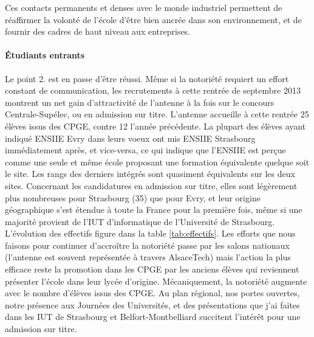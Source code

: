 \documentclass[11pt]{article}
\begin{document}
\medskip
Ces  contacts  permanents et  denses  avec  le  monde industriel  permettent  de
réaffirmer la volonté de l'école d'être bien ancrée dans son environnement, et de
fournir des cadres de haut niveau aux entreprises.



\paragraph{Étudiants entrants} 
Le point 2. est en passe d'être  réussi. Même si la notoriété requiert un effort
constant de  communication, les recrutements  à cette rentrée de  septembre 2013
montrent  un net  gain d'attractivité  de l'antenne  à la  fois sur  le concours
Centrale-Supélec,  ou  en admission  sur  titre.   L'antenne accueille  à  cette
rentrée 25 élèves issus des CPGE,  contre 12 l'année précédente.  La plupart des
élèves ayant  indiqué ENSIIE  Evry dans  leurs voeux  ont mis  ENSIIE Strasbourg
immédiatement après, et vice-versa, ce qui indique que l'ENSIIE est perçue comme
une seule  et même  école proposant  une formation  équivalente quelque  soit le
site. Les  rangs des derniers intégrés  sont quasiment équivalents sur  les deux
sites.   Concernant  les  candidatures  en   admission  sur  titre,  elles  sont
légèrement plus nombreuses  pour Strasbourg (35) que pour Evry,  et leur origine
géographique s'est étendue à toute la France  pour la première fois, même si une
majorité    provient    de    l'IUT   d'informatique    de    l'Université    de
Strasbourg. L'évolution des effectifs  figure dans la table \ref{tab:effectifs}.
Les efforts que  nous faisons pour continuer d'accroître la  notoriété passe par
les salons  nationaux (l'antenne est  souvent représentée à  travers AlsaceTech)
mais l'action la plus efficace reste la  promotion dans les CPGE par les anciens
élèves   qui   reviennent  présenter   l'école   dans   leur  lycée   d'origine.
Mécaniquement, la notoriété augmente avec le  nombre d'élèves issus des CPGE. Au
plan régional, nos portes ouvertes, notre présence aux Journées des Universités,
et  des   présentations  que  j'ai  faites   dans  les  IUT  de   Strasbourg  et
Belfort-Montbelliard succitent l'intérêt pour une admission sur titre.
\end{document}
